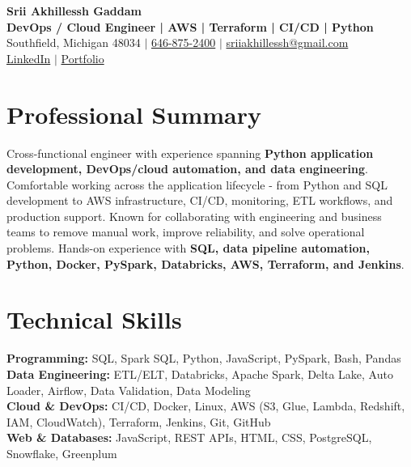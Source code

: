 \documentclass[letterpaper,10pt]{article}
\begin{document}
\fontsize{9.35pt}{10.45pt}\selectfont

\begin{center}
    {\LARGE \textbf{Srii Akhillessh Gaddam}} \\[-1pt]
    \textbf{DevOps / Cloud Engineer | AWS | Terraform | CI/CD | Python} \\[2pt]
    Southfield, Michigan 48034 $|$
    \href{tel:6468752400}{646-875-2400} $|$
    \href{mailto:sriiakhillessh@gmail.com}{sriiakhillessh@gmail.com} \\[1pt]
    \href{https://www.linkedin.com/in/srii-akhiilessh-gaddam-b48668191/}{LinkedIn} $|$
    \href{https://sriiakhillesshg.github.io/portfolio/}{Portfolio}
\end{center}
\vspace{-8pt}

\section{Professional Summary}
\small{Cross-functional engineer with experience spanning \textbf{Python application development, DevOps/cloud automation, and data engineering}. Comfortable working across the application lifecycle - from Python and SQL development to AWS infrastructure, CI/CD, monitoring, ETL workflows, and production support. Known for collaborating with engineering and business teams to remove manual work, improve reliability, and solve operational problems. Hands-on experience with \textbf{SQL, data pipeline automation, Python, Docker, PySpark, Databricks, AWS, Terraform, and Jenkins}.}

\section{Technical Skills}
\small{
\textbf{Programming:} SQL, Spark SQL, Python, JavaScript, PySpark, Bash, Pandas \\
\textbf{Data Engineering:} ETL/ELT, Databricks, Apache Spark, Delta Lake, Auto Loader, Airflow, Data Validation, Data Modeling \\
\textbf{Cloud \& DevOps:} CI/CD, Docker, Linux, AWS (S3, Glue, Lambda, Redshift, IAM, CloudWatch), Terraform, Jenkins, Git, GitHub \\
\textbf{Web \& Databases:} JavaScript, REST APIs, HTML, CSS, PostgreSQL, Snowflake, Greenplum
}
\end{document}
